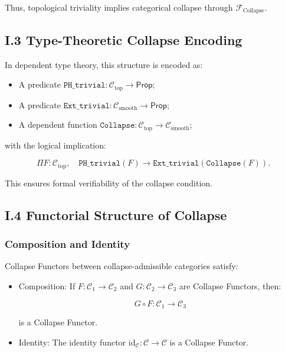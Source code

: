 \documentclass[11pt]{article}
\begin{document}
Thus, topological triviality implies categorical collapse through \( \mathcal{F}_{\mathrm{Collapse}} \).

\subsection*{I.3 Type-Theoretic Collapse Encoding}

In dependent type theory, this structure is encoded as:

\begin{itemize}
    \item A predicate \( \texttt{PH\_trivial} : \mathcal{C}_{\mathrm{top}} \to \mathsf{Prop} \);
    \item A predicate \( \texttt{Ext\_trivial} : \mathcal{C}_{\mathrm{smooth}} \to \mathsf{Prop} \);
    \item A dependent function \( \texttt{Collapse} : \mathcal{C}_{\mathrm{top}} \to \mathcal{C}_{\mathrm{smooth}} \);
\end{itemize}

with the logical implication:

\[
\Pi F : \mathcal{C}_{\mathrm{top}}, \quad \texttt{PH\_trivial}(F) \to \texttt{Ext\_trivial}(\texttt{Collapse}(F)).
\]

This ensures formal verifiability of the collapse condition.

\subsection*{I.4 Functorial Structure of Collapse}

\subsubsection*{Composition and Identity}

Collapse Functors between collapse-admissible categories satisfy:

\begin{itemize}
    \item Composition: If \( F : \mathcal{C}_1 \to \mathcal{C}_2 \) and \( G : \mathcal{C}_2 \to \mathcal{C}_3 \) are Collapse Functors, then:

\[
G \circ F : \mathcal{C}_1 \to \mathcal{C}_3
\]

is a Collapse Functor.

    \item Identity: The identity functor \( \mathrm{id}_{\mathcal{C}} : \mathcal{C} \to \mathcal{C} \) is a Collapse Functor.
\end{itemize}
\end{document}

